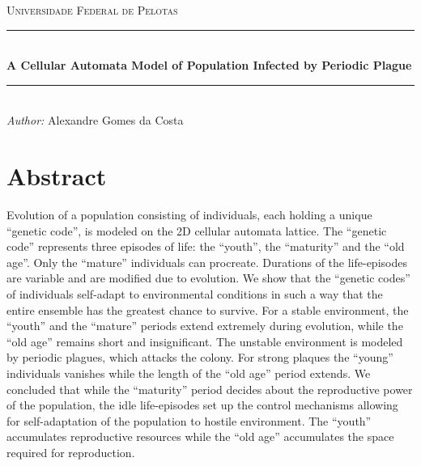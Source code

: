 \documentclass{article}
\begin{document}

\begin{titlepage}

\newcommand{\HRule}{\rule{\linewidth}{0.5mm}} %

\center %

\textsc{\LARGE Universidade Federal de Pelotas}\\[1.5cm]

\HRule \\[0.4cm]
{\huge \bfseries A Cellular Automata Model of Population Infected by Periodic Plague}\\[0.4cm]
\HRule \\[1.5cm]

\emph{Author:} Alexandre Gomes da Costa

\vfill

\end{titlepage}


\tableofcontents %

\newpage %


\section{Abstract}

Evolution of a population consisting of individuals, each holding a unique “genetic code”, is modeled on the 2D cellular automata lattice. The “genetic code” represents three episodes of life: the “youth”, the “maturity” and the “old age”. Only the “mature” individuals can procreate. Durations of the life-episodes are variable and are modified due to evolution. We show that the “genetic codes” of individuals self-adapt to environmental conditions in such a way that the entire ensemble has the greatest chance to survive. For a stable environment, the “youth” and the “mature” periods extend extremely during evolution, while the “old age” remains short and insignificant. The unstable environment is modeled by periodic plagues, which attacks the colony. For strong plaques the “young” individuals vanishes while the length of the “old age” period extends. We concluded that while the “maturity” period decides about the reproductive power of the population, the idle life-episodes set up the control mechanisms allowing for self-adaptation of the population to hostile environment. The “youth” accumulates reproductive resources while the “old age” accumulates the space required for reproduction.
\end{document}
